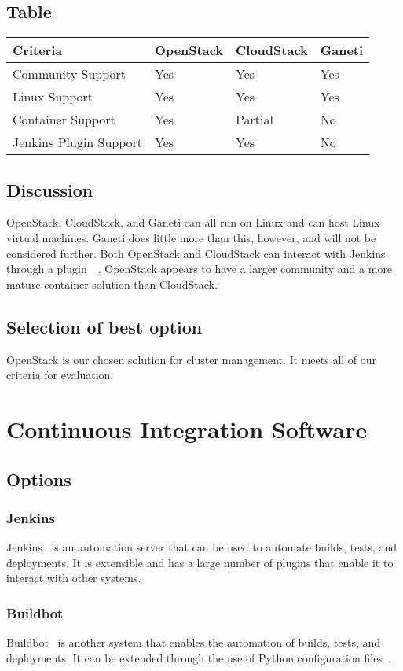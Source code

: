 \documentclass[10pt,letterpaper,onecolumn,journal]{IEEEtran}
\begin{document}
\subsection{Table}
\begin{center}
  \begin{tabular}{llll}
    Criteria & OpenStack & CloudStack & Ganeti \\ \midrule
    Community Support       & Yes & Yes & Yes \\ \midrule
    Linux Support           & Yes & Yes & Yes \\ \midrule
    Container Support       & Yes & Partial & No \\ \midrule
    Jenkins Plugin Support  & Yes & Yes & No \\ \bottomrule
  \end{tabular}
\end{center}
\subsection{Discussion}
OpenStack, CloudStack, and Ganeti can all run on Linux and can host Linux virtual machines.
Ganeti does little more than this, however, and will not be considered further.
Both OpenStack and CloudStack can interact with Jenkins through a plugin~\cite{jcloudsplugin}~\cite{jcloudsproviders}.
OpenStack appears to have a larger community and a more mature container solution than CloudStack.
\subsection{Selection of best option}
OpenStack is our chosen solution for cluster management. It meets all of our criteria for evaluation.

\section{Continuous Integration Software}
\subsection{Options}
\subsubsection{Jenkins}
Jenkins~\cite{jenkinsmain} is an automation server that can be used to automate builds, tests, and deployments.
It is extensible and has a large number of plugins that enable it to interact with other systems. 
\subsubsection{Buildbot}
Buildbot~\cite{buildbotmain} is another system that enables the automation of builds, tests, and deployments.
It can be extended through the use of Python configuration files~\cite{buildbotconfig}. 
\end{document}
